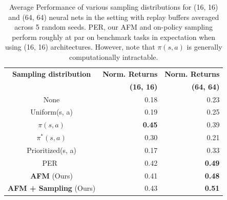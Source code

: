 \begin{table}
    \centering
    \small{
    \begin{tabular}{|c|r|r|}
    \hline
    \textbf{Sampling distribution} & \textbf{Norm. Returns} & \textbf{Norm. Returns} \\
     & \textbf{(16, 16)} & \textbf{(64, 64)} \\
     \hline\hline
    None &  0.18 & 0.23 \\
    \hline
    Uniform(s, a) &  0.19 & 0.25 \\
    \hline
    $\pi(s, a)$ &  \textbf{0.45} & 0.39 \\
    \hline
    $\pi^*(s, a)$ & 0.30 & 0.21 \\
    \hline
    Prioritized(s, a) & 0.17 & 0.33 \\
    \hline
    PER~\cite{Schaul2015} & 0.42 & \textbf{0.49}\\
    \hline
    \textbf{AFM} (Ours) & 0.41 & \textbf{0.48} \\
    \hline
    \textbf{AFM + Sampling} (Ours) & 0.43 & \textbf{0.51} \\
    \hline
     \end{tabular}}
    \caption{\label{table:final}Average Performance of various sampling distributions for (16, 16) and (64, 64) neural nets in the setting with replay buffers averaged across 5 random seeds. PER, our AFM and on-policy sampling perform roughly at par on benchmark tasks in expectation when using (16, 16) architectures. However, note that  $\pi(s,a)$ is generally computationally intractable.}
    \vspace{-0.2in}
    \vspace{-10pt}
\end{table}
